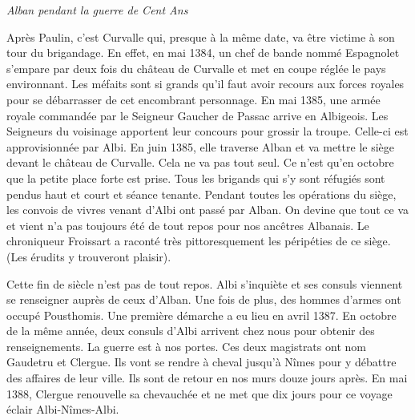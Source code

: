 
\begin{center}
    {\Large\itshape Alban pendant la guerre de Cent Ans}
\end{center}

\vspace{1.5em}

\noindent
Après Paulin, c'est Curvalle qui, presque à la même date, va être victime à son tour
du brigandage. En effet, en mai 1384, un chef de bande nommé Espagnolet s'empare par
deux fois du château de Curvalle et met en coupe réglée le pays environnant. Les
méfaits sont si grands qu'il faut avoir recours aux forces royales pour se débarrasser
de cet encombrant personnage. En mai 1385, une armée royale commandée par le Seigneur
Gaucher de Passac arrive en Albigeois. Les Seigneurs du voisinage apportent leur
concours pour grossir la troupe. Celle-ci est approvisionnée par Albi. En juin 1385,
elle traverse Alban et va mettre le siège devant le château de Curvalle. Cela ne va
pas tout seul. Ce n'est qu'en octobre que la petite place forte est prise. Tous les
brigands qui s'y sont réfugiés sont pendus haut et court et séance tenante. Pendant
toutes les opérations du siège, les convois de vivres venant d'Albi ont passé par
Alban. On devine que tout ce va et vient n'a pas toujours été de tout repos pour nos
ancêtres Albanais. Le chroniqueur Froissart a raconté très pittoresquement les
péripéties de ce siège. (Les érudits y trouveront plaisir).

\medskip

\noindent
Cette fin de siècle n'est pas de tout repos. Albi s'inquiète et ses consuls viennent
se renseigner auprès de ceux d'Alban. Une fois de plus, des hommes d'armes ont occupé
Pousthomis. Une première démarche a eu lieu en avril 1387. En octobre de la même
année, deux consuls d'Albi arrivent chez nous pour obtenir des renseignements. La
guerre est à nos portes. Ces deux magistrats ont nom Gaudetru et Clergue. Ils vont
se rendre à cheval jusqu'à Nîmes pour y débattre des affaires de leur ville. Ils
sont de retour en nos murs douze jours après. En mai 1388, Clergue renouvelle sa
chevauchée et ne met que dix jours pour ce voyage éclair Albi-Nîmes-Albi.

